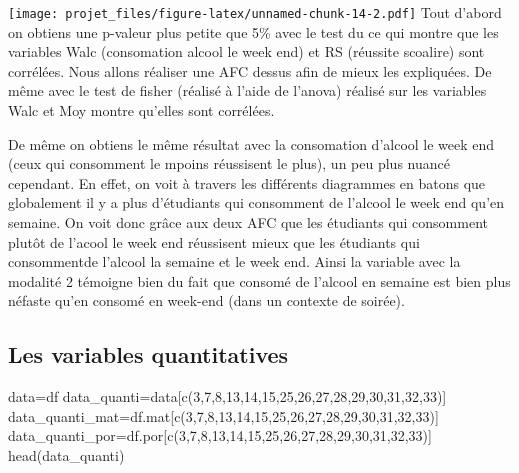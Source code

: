 \documentclass[
]{article}
\newenvironment{Shaded}{\begin{snugshade}}{\end{snugshade}}
\newcommand{\DecValTok}[1]{\textcolor[rgb]{0.00,0.00,0.81}{#1}}
\newcommand{\FunctionTok}[1]{\textcolor[rgb]{0.00,0.00,0.00}{#1}}
\newcommand{\NormalTok}[1]{#1}
\newcommand{\OtherTok}[1]{\textcolor[rgb]{0.56,0.35,0.01}{#1}}
\begin{document}
\texttt{[image: projet\_files/figure-latex/unnamed-chunk-14-2.pdf]} Tout
d'abord on obtiens une p-valeur plus petite que 5\% avec le test du
 ce qui montre que les variables Walc (consomation alcool le week
end) et RS (réussite scoalire) sont corrélées. Nous allons réaliser une
AFC dessus afin de mieux les expliquées. De même avec le test de fisher
(réalisé à l'aide de l'anova) réalisé sur les variables Walc et Moy
montre qu'elles sont corrélées.

De même on obtiens le même résultat avec la consomation d'alcool le week
end (ceux qui consomment le mpoins réussisent le plus), un peu plus
nuancé cependant. En effet, on voit à travers les différents diagrammes
en batons que globalement il y a plus d'étudiants qui consomment de
l'alcool le week end qu'en semaine. On voit donc grâce aux deux AFC que
les étudiants qui consomment plutôt de l'acool le week end réussisent
mieux que les étudiants qui consommentde l'alcool la semaine et le week
end. Ainsi la variable avec la modalité 2 témoigne bien du fait que
consomé de l'alcool en semaine est bien plus néfaste qu'en consomé en
week-end (dans un contexte de soirée).

\hypertarget{les-variables-quantitatives}{%
\subsection{Les variables
quantitatives}\label{les-variables-quantitatives}}

\begin{Shaded}
\begin{Highlighting}[]
\NormalTok{data}\OtherTok{=}\NormalTok{df}
\NormalTok{data\_quanti}\OtherTok{=}\NormalTok{data[}\FunctionTok{c}\NormalTok{(}\DecValTok{3}\NormalTok{,}\DecValTok{7}\NormalTok{,}\DecValTok{8}\NormalTok{,}\DecValTok{13}\NormalTok{,}\DecValTok{14}\NormalTok{,}\DecValTok{15}\NormalTok{,}\DecValTok{25}\NormalTok{,}\DecValTok{26}\NormalTok{,}\DecValTok{27}\NormalTok{,}\DecValTok{28}\NormalTok{,}\DecValTok{29}\NormalTok{,}\DecValTok{30}\NormalTok{,}\DecValTok{31}\NormalTok{,}\DecValTok{32}\NormalTok{,}\DecValTok{33}\NormalTok{)]}
\NormalTok{data\_quanti\_mat}\OtherTok{=}\NormalTok{df.mat[}\FunctionTok{c}\NormalTok{(}\DecValTok{3}\NormalTok{,}\DecValTok{7}\NormalTok{,}\DecValTok{8}\NormalTok{,}\DecValTok{13}\NormalTok{,}\DecValTok{14}\NormalTok{,}\DecValTok{15}\NormalTok{,}\DecValTok{25}\NormalTok{,}\DecValTok{26}\NormalTok{,}\DecValTok{27}\NormalTok{,}\DecValTok{28}\NormalTok{,}\DecValTok{29}\NormalTok{,}\DecValTok{30}\NormalTok{,}\DecValTok{31}\NormalTok{,}\DecValTok{32}\NormalTok{,}\DecValTok{33}\NormalTok{)]}
\NormalTok{data\_quanti\_por}\OtherTok{=}\NormalTok{df.por[}\FunctionTok{c}\NormalTok{(}\DecValTok{3}\NormalTok{,}\DecValTok{7}\NormalTok{,}\DecValTok{8}\NormalTok{,}\DecValTok{13}\NormalTok{,}\DecValTok{14}\NormalTok{,}\DecValTok{15}\NormalTok{,}\DecValTok{25}\NormalTok{,}\DecValTok{26}\NormalTok{,}\DecValTok{27}\NormalTok{,}\DecValTok{28}\NormalTok{,}\DecValTok{29}\NormalTok{,}\DecValTok{30}\NormalTok{,}\DecValTok{31}\NormalTok{,}\DecValTok{32}\NormalTok{,}\DecValTok{33}\NormalTok{)]}
\FunctionTok{head}\NormalTok{(data\_quanti)}
\end{Highlighting}
\end{Shaded}
\end{document}
